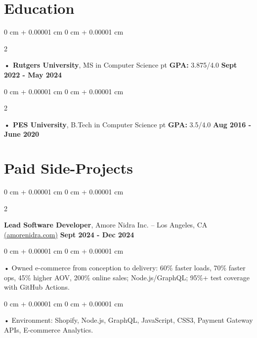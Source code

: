\documentclass[10pt, letterpaper]{article}
\newenvironment{onecolentry}{
    \begin{adjustwidth}{
        0 cm + 0.00001 cm
    }{
        0 cm + 0.00001 cm
    }
}{
    \end{adjustwidth}
} %
\newenvironment{twocolentry}[2][]{
    \onecolentry
    \def\secondColumn{#2}
    \setcolumnwidth{\fill, 4.5 cm}
    \begin{paracol}{2}
}{
    \switchcolumn \raggedleft \secondColumn
    \end{paracol}
    \endonecolentry
} %
\begin{document}
        \section{Education}
        \vspace{2 pt }
        \begin{twocolentry}{
            \textbf{Sept 2022 - May 2024}
        }
            \textbf{ • Rutgers University}, MS in Computer Science  pt \textbf{GPA:} 3.875/4.0  \end{twocolentry}

        \begin{twocolentry}{
            \textbf{Aug 2016 - June 2020}
        }
            \textbf{ • PES University}, B.Tech in Computer Science  pt \textbf{GPA:} 3.5/4.0  \end{twocolentry}

    \vspace{2 pt }
    \section{Paid Side-Projects}
            \vspace{2 pt }
                    \begin{twocolentry}{
            \textbf{Sept 2024 - Dec 2024}
        }
            \textbf{Lead Software Developer}, Amore Nidra Inc. -- Los Angeles, CA \href{https://amorenidra.com}{(amorenidra.com)}\end{twocolentry}

        \begin{onecolentry}
             • Owned e-commerce from conception to delivery: 60\% faster loads, 70\% faster ops, 45\% higher AOV, 200\% online sales; Node.js/GraphQL; 95\%+ test coverage with GitHub Actions.
        \end{onecolentry}
        \begin{onecolentry}
             • Environment: Shopify, Node.js, GraphQL, JavaScript, CSS3, Payment Gateway APIs, E-commerce Analytics.
        \end{onecolentry}

\vspace{2 pt }
\end{document}
